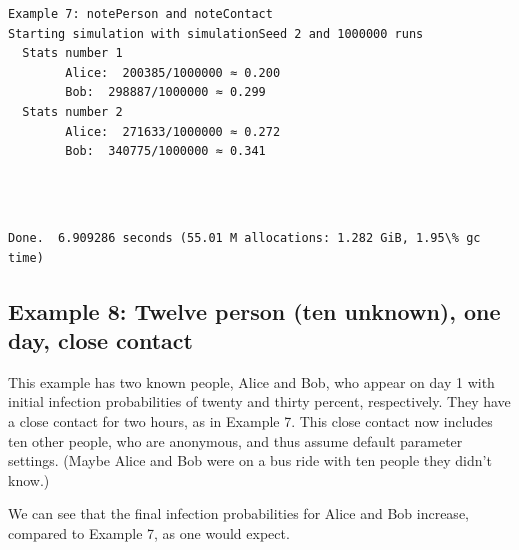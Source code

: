 \documentclass[11pt]{article}
\begin{document}
    \begin{Verbatim}[commandchars=\\\{\}]
Example 7: notePerson and noteContact
Starting simulation with simulationSeed 2 and 1000000 runs
  Stats number 1
        Alice:  200385/1000000 ≈ 0.200
        Bob:  298887/1000000 ≈ 0.299
  Stats number 2
        Alice:  271633/1000000 ≈ 0.272
        Bob:  340775/1000000 ≈ 0.341
    \end{Verbatim}

    \begin{center}
    \end{center}
    { \hspace*{\fill} \\}
    
    \begin{Verbatim}[commandchars=\\\{\}]

Done.  6.909286 seconds (55.01 M allocations: 1.282 GiB, 1.95\% gc time)
    \end{Verbatim}
\newpage
    \hypertarget{example-8-twelve-person-ten-unknown-one-day-close-contact}{%
\subsection{Example 8: Twelve person (ten unknown), one day, close
contact}\label{example-8-twelve-person-ten-unknown-one-day-close-contact}}

This example has two known people, Alice and Bob, who appear on day 1
with initial infection probabilities of twenty and thirty percent,
respectively. They have a close contact for two hours, as in Example 7.
This close contact now includes ten other people, who are anonymous, and
thus assume default parameter settings. (Maybe Alice and Bob were on a
bus ride with ten people they didn't know.)

We can see that the final infection probabilities for Alice and Bob
increase, compared to Example 7, as one would expect.
\end{document}
